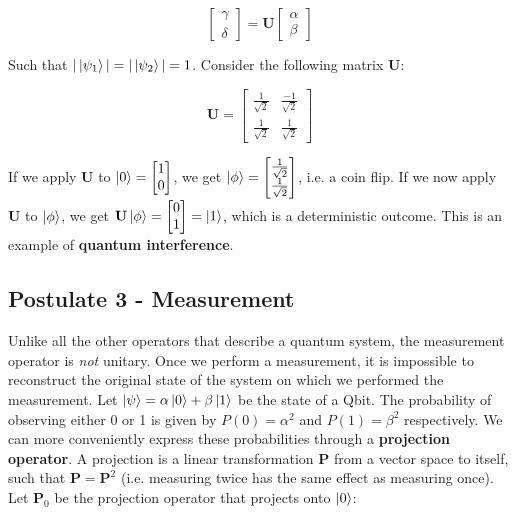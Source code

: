 \documentclass[12pt]{article}
\begin{document}
\[ \begin{bmatrix} \gamma \\ \delta \end{bmatrix} = \textbf{U} \begin{bmatrix} \alpha \\ \beta \end{bmatrix} \]

\noindent
Such that $|\ket{\psi_1}| = |\ket{\psi_2}| = 1$. 
Consider the following matrix $\textbf{U}$:

\[ \textbf{U} = \begin{bmatrix}
    \frac{1}{\sqrt{2}} & \frac{-1}{\sqrt{2}} \\
    \frac{1}{\sqrt{2}} & \frac{1}{\sqrt{2}}
\end{bmatrix} \]

\noindent
If we apply $\textbf{U}$ to $\ket{0} = \begin{bmatrix} 1 \\ 0 \end{bmatrix}$, we get $\ket{\phi} = \begin{bmatrix} \frac{1}{\sqrt{2}} \\ \frac{1}{\sqrt{2}} \end{bmatrix}$, i.e. a coin flip.
If we now apply $\textbf{U}$ to $\ket{\phi}$, we get $\textbf{U}\ket{\phi} = \begin{bmatrix} 0 \\ 1 \end{bmatrix} = \ket{1}$, which is a deterministic outcome.
This is an example of \textbf{quantum interference}.

\subsection*{Postulate 3 - Measurement}
Unlike all the other operators that describe a quantum system, the measurement operator is \textit{not} unitary.
Once we perform a measurement, it is impossible to reconstruct the original state of the system on which we performed the measurement.
Let $\ket{\psi} = \alpha \ket{0} + \beta \ket{1}$ be the state of a Qbit.
The probability of observing either 0 or 1 is given by $P(0) = \alpha^2$ and $P(1) = \beta^2$ respectively.
We can more conveniently express these probabilities through a \textbf{projection operator}.
A projection is a linear transformation $\textbf{P}$ from a vector space to itself, such that $\textbf{P} = \textbf{P}^2$ (i.e. measuring twice has the same effect as measuring once).
Let $\textbf{P}_0$ be the projection operator that projects onto $\ket{0}$:
\end{document}
